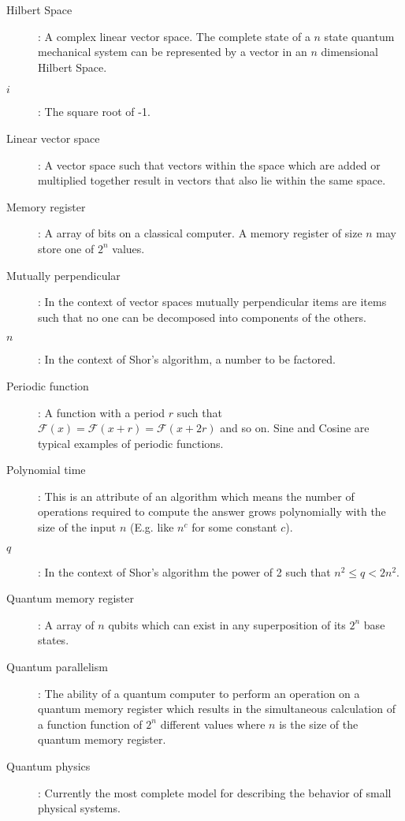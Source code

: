 \documentclass[]{article}
\begin{document}
\begin{description}
\item[Hilbert Space]:
	A complex linear vector space.  The complete state of a $n$
state quantum mechanical system can be represented by a vector in an $n$
dimensional Hilbert Space.

\item[$i$]:
	The square root of -1.

\item[Linear vector space]:
	A vector space such that vectors within the space which are added or multiplied together result in vectors that also lie within the same space.

\item[Memory register]:
	A array of bits on a classical computer.  A memory register of
size $n$ may store one of $2^{n}$ values.

\item[Mutually perpendicular]:
	In the context of vector spaces mutually perpendicular items
are items such that no one can be decomposed into components of the
others.

\item[$n$]:
	In the context of Shor's algorithm, a number to be factored.

\item[Periodic function]:
	A function with a period $r$ such that $\mathcal{F}(x) = \mathcal{F}(x + r) = \mathcal{F}(x + 2r)$ and so on. Sine and Cosine are typical examples of periodic functions.

\item[Polynomial time]:
	This is an attribute of an algorithm which means the number of
operations required to compute the answer grows polynomially with the
size of the input $n$ (E.g. like $n^{c}$ for some constant $c$).

\item[$q$]:
	In the context of Shor's algorithm the power of 2 such that
$n^{2} \leq q < 2n^{2}$.

\item[Quantum memory register]:
	A array of $n$ qubits which can exist in any superposition of
its $2^{n}$ base states.

\item[Quantum parallelism]:
	The ability of a quantum computer to perform an operation on a
quantum memory register which results in the simultaneous calculation
of a function function of $2^{n}$ different values where $n$ is the size of
the quantum memory register.

\item[Quantum physics]:
	Currently the most complete model for describing the behavior
of small physical systems.


\end{description}
\end{document}
